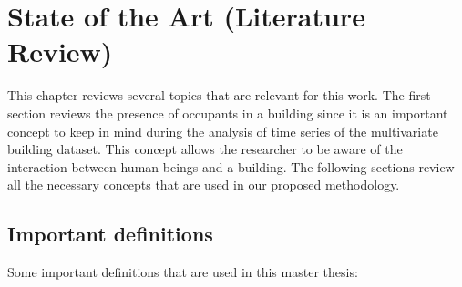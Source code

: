 \chapter{State of the Art (Literature Review)} %
\label{Chapter2} %
\minitoc



This chapter reviews several topics that are relevant for this work. The first section reviews the presence of occupants in a building since it is an important concept to keep in mind during the analysis of time series of the multivariate building dataset. This concept allows the researcher to be aware of the interaction between human beings and a building. The following sections review all the necessary concepts that are used in our proposed methodology.


\section{Important definitions}

Some important definitions that are used in this master thesis:

